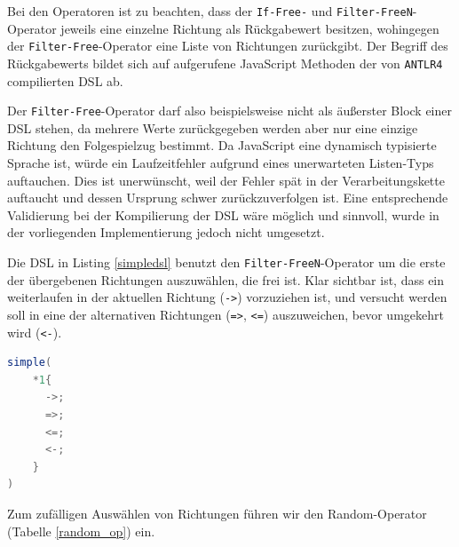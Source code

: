 \documentclass[conference]{IEEEtran}
\begin{document}
Bei den Operatoren ist zu beachten, dass der \texttt{If-Free-} und \texttt{Filter-FreeN}-Operator jeweils eine einzelne Richtung als Rückgabewert besitzen, wohingegen der \texttt{Filter-Free}-Operator eine Liste von Richtungen zurückgibt. Der Begriff des Rückgabewerts bildet sich auf aufgerufene JavaScript Methoden der von \texttt{ANTLR4} compilierten DSL ab.

Der \texttt{Filter-Free}-Operator darf also beispielsweise nicht als äußerster Block einer DSL stehen, da mehrere Werte zurückgegeben werden aber nur eine einzige Richtung den Folgespielzug bestimmt. Da JavaScript eine dynamisch typisierte Sprache ist, würde ein Laufzeitfehler aufgrund eines unerwarteten Listen-Typs auftauchen. Dies ist unerwünscht, weil der Fehler spät in der Verarbeitungskette auftaucht und dessen Ursprung schwer zurückzuverfolgen ist. Eine entsprechende Validierung bei der Kompilierung der DSL wäre möglich und sinnvoll, wurde in der vorliegenden Implementierung jedoch nicht umgesetzt.

Die DSL in Listing \ref{simpledsl} benutzt den \texttt{Filter-FreeN}-Operator um die erste der übergebenen Richtungen auszuwählen, die frei ist. Klar sichtbar ist, dass ein weiterlaufen in der aktuellen Richtung (\texttt{->}) vorzuziehen ist, und versucht werden soll in eine der alternativen Richtungen (\texttt{=>}, \texttt{<=}) auszuweichen, bevor umgekehrt wird (\texttt{<-}).


\begin{lstlisting}[language=Java, captionpos=b, caption=AI DSL mit F\texttt{Filter-FreeN}-Operator, label=simpledsl]
simple(
    *1{
      ->;
      =>;
      <=;
      <-;
    }
)
\end{lstlisting}

Zum zufälligen Auswählen von Richtungen führen wir den Random-Operator (Tabelle \ref{random_op}) ein.
\end{document}
